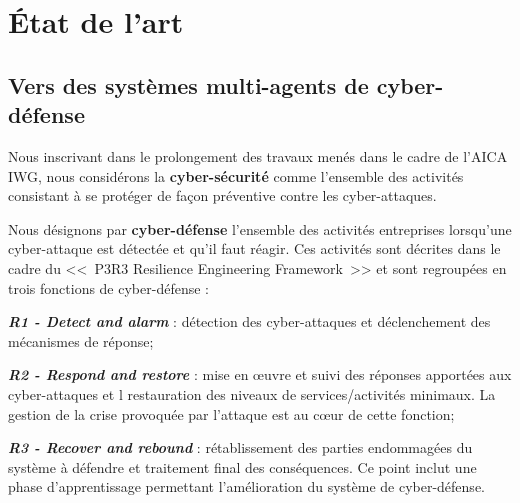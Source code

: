 \documentclass[conference]{IEEEtran}
\begin{document}
\section{\'Etat de l'art}

\subsection{Vers des systèmes multi-agents de cyber-défense}



Nous inscrivant dans le prolongement des travaux menés dans le cadre de l'AICA IWG, nous considérons la \textbf{cyber-sécurité} comme l'ensemble des activités  consistant à se protéger de façon préventive contre les cyber-attaques\cite{theron_autonomous_2021}.


Nous désignons par \textbf{cyber-défense}  l'ensemble des activités entreprises lorsqu'une cyber-attaque est détectée et qu'il faut réagir. Ces activités sont décrites dans le cadre du <<~P3R3 Resilience Engineering Framework~>>\cite{theron_p3r3_2021} et sont regroupées en trois fonctions de cyber-défense :

\noindent
\textit{\textbf{R1 - Detect and alarm}} : détection des cyber-attaques  et déclenchement des mécanismes de réponse; %

\noindent
\textit{\textbf{R2 - Respond and restore}} : mise en œuvre et suivi des réponses apportées aux cyber-attaques et l restauration des niveaux de services/activités minimaux. La gestion de la crise provoquée par l'attaque est au cœur de cette fonction;

\noindent
\textit{\textbf{R3 - Recover and rebound}} : rétablissement des parties endommagées du système à défendre et traitement final des conséquences. Ce point inclut une phase d'apprentissage permettant l'amélioration du système de cyber-défense.

\end{document}
